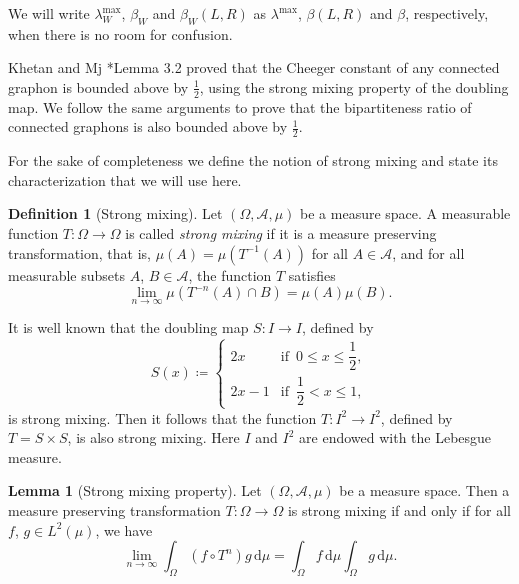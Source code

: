 \documentclass[12pt,a4paper,bold]{thesis}
\theoremstyle{definition}
\newtheorem{defn}[thm]{Definition}
\newtheorem{lemma}[thm]{Lemma}
\newcommand*{\map}[3]{#1 \colon #2 \to #3}
\begin{document}
We will write $\lambda_W^{\max}$, $\beta_W$ and $\beta_W(L,R)$ as $\lambda^{\max}$, 
$\beta(L,R)$ and $\beta$, respectively, when there is no room for confusion.

Khetan and Mj \cite{Abhishek-Mahan24}*{Lemma 3.2} proved that 
the Cheeger constant of any connected graphon is bounded above by $\frac{1}{2}$, 
using the strong mixing property of the doubling map. 
We follow the same arguments to prove that the bipartiteness ratio of connected graphons 
is also bounded above by $\frac{1}{2}$.

For the sake of completeness we define the notion of strong mixing and state 
its characterization that we will use here.

\begin{defn}[Strong mixing]
    Let $(\Omega,\mathcal{A},\mu)$ be a measure space. A measurable function 
    $\map{T}{\Omega}{\Omega}$ is called \emph{strong mixing} if it is a measure preserving 
    transformation, that is, $\mu(A) = \mu(T^{-1}(A))$ for all $A \in \mathcal{A}$, 
    and for all measurable subsets $A$, $B \in \mathcal{A}$, the function $T$ satisfies
    \begin{equation*}
        \lim_{n \to \infty} \mu(T^{-n}(A) \cap B) = \mu(A) \mu(B).
    \end{equation*} 
\end{defn}

It is well known that the doubling map $\map{S}{I}{I}$, defined by
\begin{equation*}
    S(x) \coloneq 
    \begin{cases}
        2x 
        & \text{if }\, 0 \leq x \leq \dfrac{1}{2},
        \\
        2x-1 
        & \text{if }\, \dfrac{1}{2} < x \leq 1,
    \end{cases}
\end{equation*}
is strong mixing. Then it follows that the function $\map{T}{I^2}{I^2}$, 
defined by $T = S \times S$, is also strong mixing. 
Here $I$ and $I^2$ are endowed with the Lebesgue measure.

\begin{lemma}[Strong mixing property]
    Let $(\Omega,\mathcal{A},\mu)$ be a measure space. Then a measure preserving 
    transformation $\map{T}{\Omega}{\Omega}$ is strong mixing if and only if 
    for all $f$, $g \in L^2(\mu)$, we have
    \begin{equation*}
        \lim_{n \to \infty} \int_\Omega (f \circ T^n)g\, \mathrm{d}\mu 
        = \int_\Omega f\, \mathrm{d}\mu \int_\Omega g\, \mathrm{d}\mu.
    \end{equation*}
\end{lemma}
\end{document}
